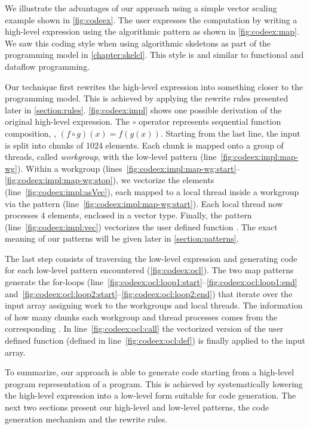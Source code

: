 We illustrate the advantages of our approach using a simple vector scaling example shown in \autoref{fig:codeex}.
The user expresses the computation by writing a high-level expression using the algorithmic  pattern as shown in \autoref{fig:codeex:map}.
We saw this coding style when using algorithmic skeletons as part of the \SkelCL programming model in \autoref{chapter:skelcl}.
This style is and similar to functional and dataflow programming.

Our technique first rewrites the high-level expression into something closer to the \OpenCL programming model.
This is achieved by applying the rewrite rules presented later in \autoref{section:rules}.
\autoref{fig:codeex:impl} shows one possible derivation of the original high-level expression.
The $\circ$ operator represents sequential function composition, \ie, $(f \circ g)(x) = f(g(x))$.
Starting from the last line, the input is split into chunks of 1024 elements.
Each chunk is mapped onto a group of threads, called \emph{workgroup}, with the  low-level pattern (line~\ref{fig:codeex:impl:map-wg}).
Within a workgroup (lines~\ref{fig:codeex:impl:map-wg:start}--\ref{fig:codeex:impl:map-wg:stop}), we vectorize the elements (line~\ref{fig:codeex:impl:asVec}), each mapped to a local thread inside a workgroup via the  pattern (line~\ref{fig:codeex:impl:map-wg:start}).
Each local thread now processes 4 elements, enclosed in a vector type.
Finally, the  pattern (line~\ref{fig:codeex:impl:vec}) vectorizes the user defined function .
The exact meaning of our patterns will be given later in \autoref{section:patterns}.

The last step consists of traversing the low-level expression and generating \OpenCL code for each low-level pattern encountered (\autoref{fig:codeex:ocl}).
The two map patterns generate the for-loops (line~\ref{fig:codeex:ocl:loop1:start}--\ref{fig:codeex:ocl:loop1:end} and~\ref{fig:codeex:ocl:loop2:start}--\ref{fig:codeex:ocl:loop2:end}) that iterate over the input array assigning work to the workgroups and local threads.
The information of how many chunks each workgroup and thread processes comes from the corresponding .
In line~\ref{fig:codeex:ocl:call} the vectorized version of the user defined  function (defined in line~\ref{fig:codeex:ocl:def}) is finally applied to the input array.

To summarize, our approach is able to generate \OpenCL code starting from a high-level program representation of a program.
This is achieved by systematically lowering the high-level expression into a low-level form suitable for code generation.
The next two sections present our high-level and low-level patterns, the code generation mechanism and the rewrite rules.

